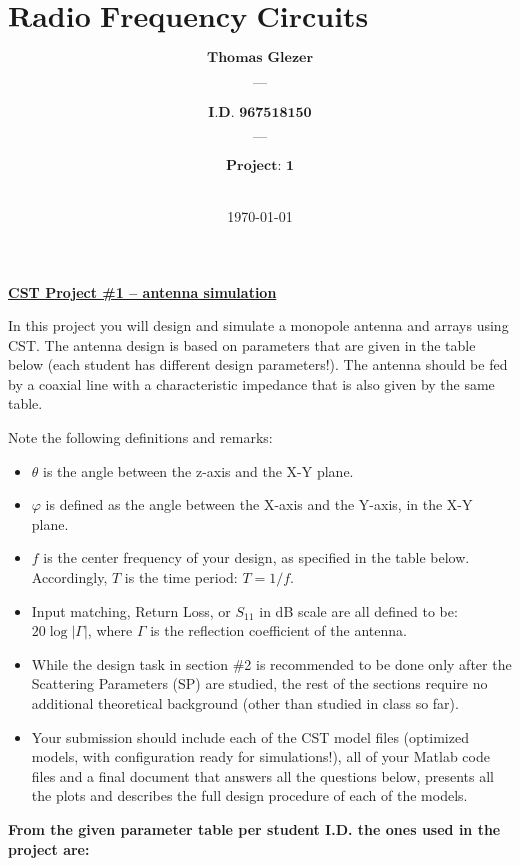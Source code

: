 \documentclass[12pt, letterpaper]{article}
\title{%
  \Large $\textbf{Radio Frequency Circuits \& Antenna}$
}
\author{
  $\textbf{Thomas Glezer}$\\\\
  $\textbf{---}$\\\\
  $\textbf{I.D. 967518150}$\\\\
  $\textbf{---}$\\\\
  $\textbf{Project: 1}$
  \\\\
}
\date{\today}
\begin{document}
\begin{titlingpage}
  \maketitle
\end{titlingpage}

\tableofcontents

\pagebreak

\begin{center}
  \underline{\textbf{CST Project \#1 – antenna simulation}}
\end{center}

In this project you will design and simulate a monopole antenna and arrays using CST. The antenna
design is based on parameters that are given in the table below (each student has different design
parameters!). The antenna should be fed by a coaxial line with a characteristic impedance that is also
given by the same table.

Note the following definitions and remarks:

\begin{itemize}
  \item $\theta$ is the angle between the z-axis and the X-Y plane.
  \item $\varphi$ is defined as the angle between the X-axis and the Y-axis, in the X-Y plane.
  \item $f$ is the center frequency of your design, as specified in the table below. Accordingly, $T$ is the time period: $T=1/f$.
  \item Input matching, Return Loss, or $S_{11}$ in dB scale are all defined to be: $20\log|\Gamma|$, where $\Gamma$ is the reflection coefficient of the antenna.
  \item While the design task in section \#2 is recommended to be done only after the Scattering Parameters (SP) are studied, the rest of the sections require no additional theoretical background (other than studied in class so far).
  \item Your submission should include each of the CST model files (optimized models, with configuration ready for simulations!), all of your Matlab code files and a final document that answers all the questions below, presents all the plots and describes the full design procedure of each of the models.
\end{itemize}

\textbf{From the given parameter table per student I.D. the ones used in the project are:}
\end{document}
